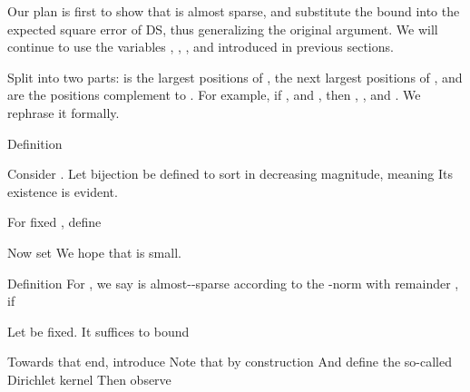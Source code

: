\startchapter [title={Theorems and Proofs}]

Our plan is first to show that  is almost sparse, and substitute the bound into the expected square error of DS, thus generalizing the original argument.
We will continue to use the variables , , , and  introduced in previous sections.

\startsection [title={Almost-Sparsity of Array Response \m {\V{a}}}]

Split  into two parts:  is the largest  positions of ,  the next  largest positions of , and  are the positions complement to .
For example, if , and , then , , and .
We rephrase it formally.

\Result
{Definition}
{
Consider .
Let bijection  be defined to sort  in decreasing magnitude, meaning
Its existence is evident.

For fixed , define
}

Now set
We hope that  is small.

\Result
{Definition}
{
For , we say  is almost--sparse according to the -norm with remainder , if
}

Let \m {\f} be fixed.
It suffices to bound

Towards that end, introduce
Note that by construction
And define the so-called Dirichlet kernel
Then observe

